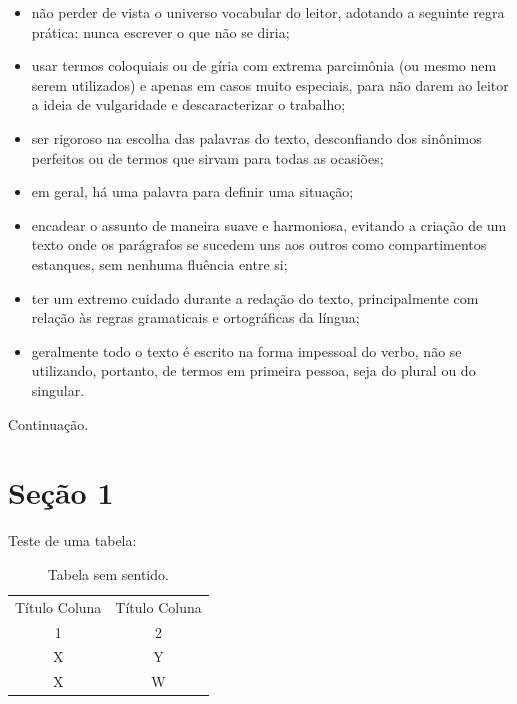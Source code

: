 \documentclass[
	12pt,			%
	openright,		%
	oneside,	
	a4paper,		%
	english,		%
	brazil			%
]{abntex2/abntex2}  %
\begin{document}
\begin{itemize}
		\item não perder de vista o universo vocabular do leitor, adotando a seguinte
regra prática: nunca escrever o que não se diria;

		\item usar termos coloquiais ou de gíria com extrema parcimônia (ou mesmo
nem serem utilizados) e apenas em casos muito especiais, para não darem ao leitor a ideia de vulgaridade e descaracterizar o trabalho;

		\item ser rigoroso na escolha das palavras do texto, desconfiando dos
sinônimos perfeitos ou de termos que sirvam para todas as ocasiões;

		\item em geral, há uma palavra para definir uma situação;

		\item encadear o assunto de maneira suave e harmoniosa, evitando a
criação de um texto onde os parágrafos se sucedem uns aos outros
como compartimentos estanques, sem nenhuma fluência entre si;

		\item ter um extremo cuidado durante a redação do texto, principalmente
com relação às regras gramaticais e ortográficas da língua;

		\item geralmente todo o texto é escrito na forma impessoal do verbo, não se utilizando,
portanto, de termos em primeira pessoa, seja do plural ou do singular.

	\end{itemize}

	Continuação.
	
	\section{Seção 1}
	
		Teste de uma tabela:

		\begin{table}[htbp]
			\caption{Tabela sem sentido.}
			\label{tabela-ssentido}
			\begin{center}
			\begin{tabular}{|c|c|}
				\hline
				Título Coluna & Título Coluna \\
				1 & 2 \\
				\hline
				X & Y \\
				\hline
				X & W \\
				\hline
			\end{tabular}
			\end{center}
		\end{table}
		
\end{document}
